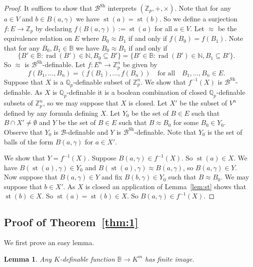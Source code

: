 \documentclass[bibalpha]{amsart}
\newtheorem{lem}[theorem]{Lemma}
\theoremstyle{definition}
\theoremstyle{remark}
\newcommand{\pring}{(\Z_p,+,\times}
\newcommand{\rad}{\operatorname{rad}}
\newcommand{\ksh}{K^{\mathrm{Sh}}}
\newcommand{\st}{\operatorname{st}}
\newcommand{\Sh}[1]{\ensuremath{\mathscr{#1}^{\mathrm{Sh}}}}
\newcommand{\Sa}[1]{\ensuremath{\mathscr{#1}}}
\newcommand{\B}{\mathbb{B}}
\newcommand{\Z}{\mathbb{Z}}
\newcommand{\N}{\mathbb{N}}
\newcommand{\Q}{\mathbb{Q}}
\begin{document}
\begin{proof}
It suffices to show that $\Sh B$ interprets $\pring)$.
Note that for any $a \in V$ and $b \in B(a,\gamma)$ we have $\st(a) = \st(b)$.
So we define a surjection $f : E \to \Z_p$ by declaring $f( B(a,\gamma) ) := \st(a)$ for all $a \in V$.
Let $\approx$ be the equivalence relation on $E$ where $B_0 \approx B_1$ if and only if $f(B_0) = f(B_1)$.
Note that for any $B_0,B_1 \in \B$ we have $B_0 \approx B_1$ if and only if 
$$ \{ B' \in \B : \rad(B') \in \N , B_0 \subseteq B' \} = \{ B' \in \B : \rad(B') \in \N , B_1 \subseteq B' \}. $$
So $\approx$ is $\Sh B$-definable.
Let $f : E^n \to \Z^n_p$ be given by 
$$ f(B_1,\ldots,B_n) = (f(B_1),\ldots,f(B_n)) \quad \text{for all} \quad B_1,\ldots,B_n \in E. $$
Suppose that $X$ is a $\Q_p$-definable subset of $\Z^n_p$.
We show that $f^{-1}(X)$ is $\Sh B$-definable.
As $X$ is $\Q_p$-definable it is a boolean combination of closed $\Q_p$-definable subsets of $\Z^n_p$, so we may suppose that $X$ is closed.
Let $X'$ be the subset of $V^n$ defined by any formula defining $X$.
Let $Y_0$ be the set of $B \in E$ such that $B \cap X' \neq \emptyset$ and $Y$ be the set of $B \in E$ such that $B \approx B_0$ for some $B_0 \in Y_0$.
Observe that $Y_0$ is $\Sa B$-definable and $Y$ is $\Sh B$-definable.
Note that $Y_0$ is the set of balls of the form $B(a,\gamma)$ for $a \in X'$.
\newline

\noindent
We show that $Y = f^{-1}(X)$.
Suppose $B(a,\gamma) \in f^{-1}(X)$.
So $\st(a) \in X$.
We have $B(\st(a),\gamma) \in Y_0$ and $B(\st(a),\gamma) \approx B(a,\gamma)$, so $B(a,\gamma) \in Y$.
Now suppose that $B(a,\gamma) \in Y$ and fix $B(b,\gamma) \in Y_0$ such that $B \approx B_0$.
We may suppose that $b \in X'$.
As $X$ is closed an application of Lemma~\ref{lem:st} shows that $\st(b) \in X$.
So $\st(a) = \st(b) \in X$.
So $B(a,\gamma) \in f^{-1}(X)$.
\end{proof}

\newpage

\subsection{Proof of Theorem~\ref{thm:1}}
We first prove an easy lemma.

\begin{lem}
\label{lem:map}
Any $K$-definable function $\B \to K^m$ has finite image.
\end{lem}
\end{document}
